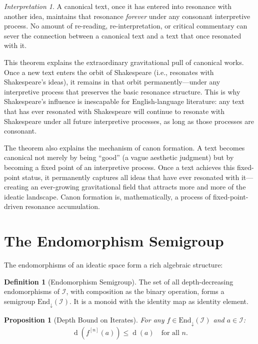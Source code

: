 \documentclass[11pt,openany]{book}
\theoremstyle{definition}
\newtheorem{definition}[axiom]{Definition}
\theoremstyle{plain}
\newtheorem{proposition}[axiom]{Proposition}
\theoremstyle{remark}
\newtheorem{interpretation}[axiom]{Interpretation}
\newcommand{\IS}{\mathcal{I}}               %
\newcommand{\depth}{\operatorname{d}}       %
\begin{document}
\begin{interpretation}
A canonical text, once it has entered into resonance with another idea, maintains that resonance \emph{forever} under any consonant interpretive process. No amount of re-reading, re-interpretation, or critical commentary can sever the connection between a canonical text and a text that once resonated with it.

This theorem explains the extraordinary gravitational pull of canonical works. Once a new text enters the orbit of Shakespeare (i.e., resonates with Shakespeare's ideas), it remains in that orbit permanently---under any interpretive process that preserves the basic resonance structure. This is why Shakespeare's influence is inescapable for English-language literature: any text that has ever resonated with Shakespeare will continue to resonate with Shakespeare under all future interpretive processes, as long as those processes are consonant.

The theorem also explains the mechanism of canon formation. A text becomes canonical not merely by being ``good'' (a vague aesthetic judgment) but by becoming a fixed point of an interpretive process. Once a text achieves this fixed-point status, it permanently captures all ideas that have ever resonated with it---creating an ever-growing gravitational field that attracts more and more of the ideatic landscape. Canon formation is, mathematically, a process of fixed-point-driven resonance accumulation.
\end{interpretation}

\section{The Endomorphism Semigroup}

The endomorphisms of an ideatic space form a rich algebraic structure:

\begin{definition}[Endomorphism Semigroup]
The set of all depth-decreasing endomorphisms of $\IS$, with composition as the binary operation, forms a semigroup $\mathrm{End}_\downarrow(\IS)$. It is a monoid with the identity map as identity element.
\end{definition}

\begin{proposition}[Depth Bound on Iterates]
For any $f \in \mathrm{End}_\downarrow(\IS)$ and $a \in \IS$:
\[
\depth(f^{[n]}(a)) \leq \depth(a) \quad \text{for all } n.
\]
\end{proposition}
\end{document}
